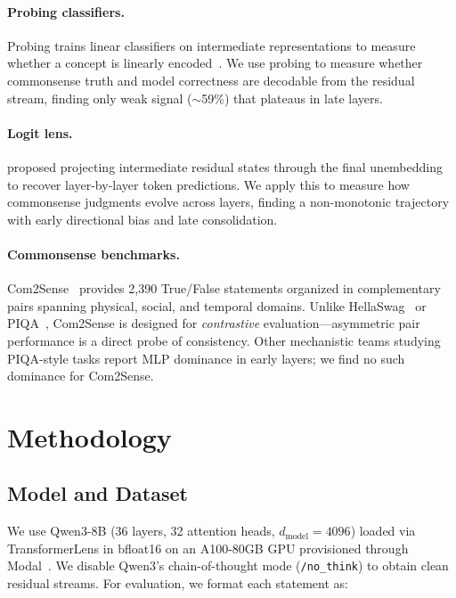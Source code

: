 \documentclass{article}
\begin{document}
\paragraph{Probing classifiers.}
Probing trains linear classifiers on intermediate representations to measure whether a concept is linearly encoded~\citep{belinkov2022probing}. We use probing to measure whether commonsense truth and model correctness are decodable from the residual stream, finding only weak signal ($\sim$59\%) that plateaus in late layers.

\paragraph{Logit lens.}
\citet{nostalgebraist2020logitlens} proposed projecting intermediate residual states through the final unembedding to recover layer-by-layer token predictions. We apply this to measure how commonsense judgments evolve across layers, finding a non-monotonic trajectory with early directional bias and late consolidation.

\paragraph{Commonsense benchmarks.}
Com2Sense~\citep{singh2021com2sense} provides 2,390 True/False statements organized in complementary pairs spanning physical, social, and temporal domains. Unlike HellaSwag~\citep{zellers2019hellaswag} or PIQA~\citep{bisk2020piqa}, Com2Sense is designed for \emph{contrastive} evaluation—asymmetric pair performance is a direct probe of consistency. Other mechanistic teams studying PIQA-style tasks report MLP dominance in early layers; we find no such dominance for Com2Sense.

\section{Methodology}
\label{sec:methods}

\subsection{Model and Dataset}

We use Qwen3-8B (36 layers, 32 attention heads, $d_\text{model}=4096$) loaded via TransformerLens in bfloat16 on an A100-80GB GPU provisioned through Modal~\citep{modal2023}. We disable Qwen3's chain-of-thought mode (\texttt{/no\_think}) to obtain clean residual streams. For evaluation, we format each statement as:
\end{document}
